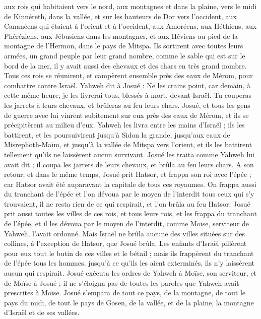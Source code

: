 \begin{multicols}{2}
aux rois qui habitaient vers le nord, aux montagnes et dans la plaine, vers le midi de Kinnéreth, dans la vallée, et sur les hauteurs de Dor vers l’occident,
aux Cananéens qui étaient à l’orient et à l’occident, aux Amoréens, aux Héthiens, aux Phéréziens, aux Jébusiens dans les montagnes, et aux Héviens au pied de la montagne de l’Hermon, dans le pays de Mitspa.
Ils sortirent avec toutes leurs armées, un grand peuple par leur grand nombre, comme le sable qui est sur le bord de la mer, il y avait aussi des chevaux et des chars en très grand nombre.
Tous ces rois se réunirent, et campèrent ensemble près des eaux de Mérom, pour combattre contre Israël.
Yahweh dit à Josué : Ne les crains point, car demain, à cette même heure, je les livrerai tous, blessés à mort, devant Israël. Tu couperas les jarrets à leurs chevaux, et brûleras au feu leurs chars.
Josué, et tous les gens de guerre avec lui vinrent subitement sur eux près des eaux de Mérom, et ils se précipitèrent au milieu d’eux.
Yahweh les livra entre les mains d’Israël ; ils les battirent, et les poursuivirent jusqu’à Sidon la grande, jusqu’aux eaux de Misrephoth-Maïm, et jusqu’à la vallée de Mitspa vers l’orient, et ils les battirent tellement qu’ils ne laissèrent aucun survivant.
Josué les traita comme Yahweh lui avait dit ; il coupa les jarrets de leurs chevaux, et brûla au feu leurs chars.
A son retour, et dans le même temps, Josué prit Hatsor, et frappa son roi avec l’épée ; car Hatsor avait été auparavant la capitale de tous ces royaumes.
On frappa aussi du tranchant de l’épée et l’on dévoua par le moyen de l'interdit tous ceux qui s’y trouvaient, il ne resta rien de ce qui respirait, et l’on brûla au feu Hatsor.
Josué prit aussi toutes les villes de ces rois, et tous leurs rois, et les frappa du tranchant de l’épée, et il les dévoua par le moyen de l'interdit, comme Moïse, serviteur de Yahweh, l’avait ordonné.
Mais Israël ne brûla aucune des villes situées sur des collines, à l’exception de Hatsor, que Josué brûla.
Les enfants d’Israël pillèrent pour eux tout le butin de ces villes et le bétail ; mais ils frappèrent du tranchant de l’épée tous les hommes, jusqu’à ce qu’ils les aient exterminés, ils n’y laissèrent aucun qui respirait.
Josué exécuta les ordres de Yahweh à Moïse, son serviteur, et de Moïse à Josué ; il ne s’éloigna pas de toutes les paroles que Yahweh avait prescrites à Moïse.
Josué s’empara de tout ce pays, de la montagne, de tout le pays du midi, de tout le pays de Gosen, de la vallée, et de la plaine, la montagne d’Israël et de ses vallées.

\end{multicols}
